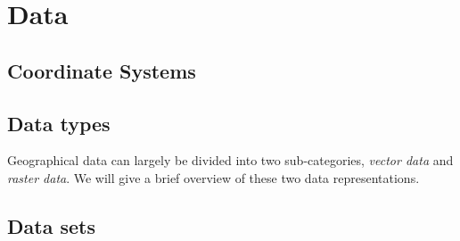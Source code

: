 \section{Data}%
\label{sec:data}



\subsection{Coordinate Systems}


\subsection{Data types}

Geographical data can largely be divided into two sub-categories, \textit{vector data} and \textit{raster data}.
We will give a brief overview of these two data representations.



%
\label{sec:raster-data}


\subsection{Data sets}






